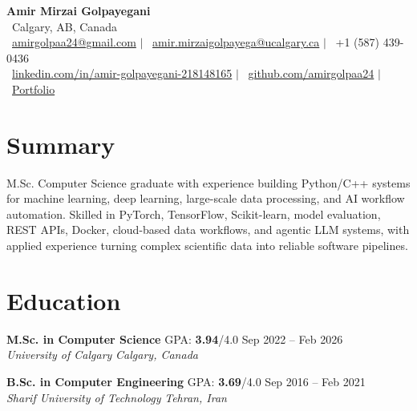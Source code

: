 \documentclass[a4paper,10pt]{article}
\newcommand{\resumeEducationSubheading}[5]{
    \textbf{#1} \hfill #2 \hfill #3 \\
    \textit{#4} \hfill \textit{#5}
}
\begin{document}

\begin{center}
    {\LARGE \textbf{Amir Mirzai Golpayegani}} \\[0.25em]
    \faMapMarker*~Calgary, AB, Canada \\[0.25em]
    \faEnvelope~\href{mailto:amirgolpaa24@gmail.com}{amirgolpaa24@gmail.com}
    $|$
    \faEnvelope~\href{mailto:amir.mirzaigolpayega@ucalgary.ca}{amir.mirzaigolpayega@ucalgary.ca}
    $|$
    \faPhone*~+1 (587) 439-0436 \\[0.25em]
    \faLinkedin~\href{https://linkedin.com/in/amir-golpayegani-218148165}{linkedin.com/in/amir-golpayegani-218148165}
    $|$
    \faGithub~\href{https://github.com/amirgolpaa24}{github.com/amirgolpaa24}
    $|$
    \faGlobe~\href{https://amir-portfolio-navy.vercel.app/}{Portfolio}
\end{center}


\section*{Summary}

M.Sc. Computer Science graduate with experience building Python/C++ systems for machine learning, deep learning, large-scale data processing, and AI workflow automation. Skilled in PyTorch, TensorFlow, Scikit-learn, model evaluation, REST APIs, Docker, cloud-based data workflows, and agentic LLM systems, with applied experience turning complex scientific data into reliable software pipelines.


\section*{Education}

\resumeEducationSubheading
{M.Sc. in Computer Science}
{GPA: \textbf{3.94}/4.0}
{Sep 2022 -- Feb 2026}
{University of Calgary}
{Calgary, Canada}

\vspace{0.35em}

\resumeEducationSubheading
{B.Sc. in Computer Engineering}
{GPA: \textbf{3.69}/4.0}
{Sep 2016 -- Feb 2021}
{Sharif University of Technology}
{Tehran, Iran}

\end{document}
